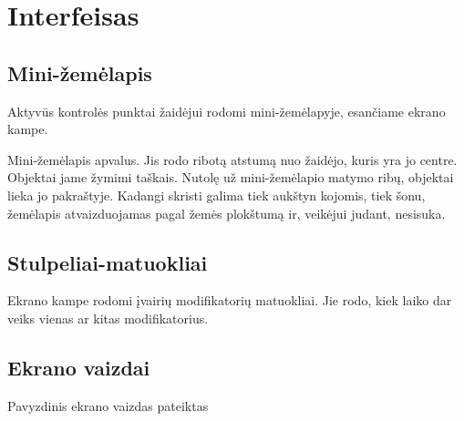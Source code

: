 \section{Interfeisas}

\subsection{Mini-žemėlapis}

Aktyvūs kontrolės punktai žaidėjui rodomi mini-žemėlapyje, esančiame ekrano kampe.

Mini-žemėlapis apvalus.
Jis rodo ribotą atstumą nuo žaidėjo, kuris yra jo centre.
Objektai jame žymimi taškais.
Nutolę už mini-žemėlapio matymo ribų, objektai lieka jo pakraštyje.
Kadangi skristi galima tiek aukštyn kojomis, tiek šonu, žemėlapis atvaizduojamas pagal žemės plokštumą ir, veikėjui judant, nesisuka.

\subsection{Stulpeliai-matuokliai}

Ekrano kampe rodomi įvairių modifikatorių matuokliai.
Jie rodo, kiek laiko dar veiks vienas ar kitas modifikatorius.

\subsection{Ekrano vaizdai}

Pavyzdinis ekrano vaizdas pateiktas 

